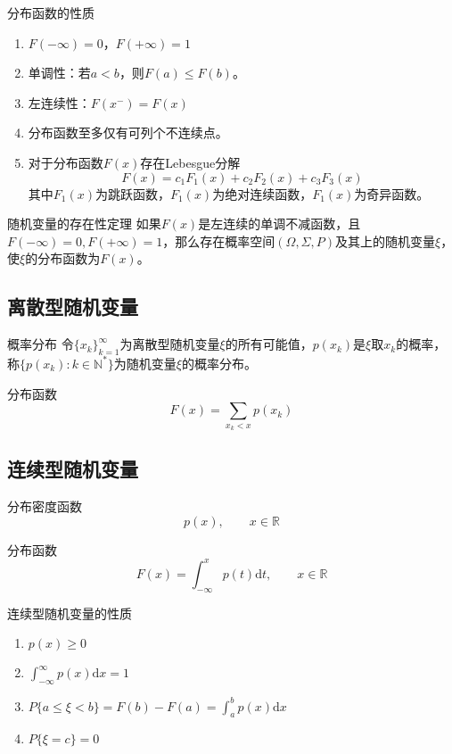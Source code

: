 \documentclass[lang = cn, scheme = chinese, thmcnt = section]{elegantbook}
\newcommand{\N}{\mathbb{N}}            %
\newcommand{\R}{\mathbb{R}}            %
\begin{document}
\begin{proposition}{分布函数的性质}
	\begin{enumerate}
		\item $F(-\infty)=0$，$F(+\infty)=1$
		\item 单调性：若$a<b$，则$F(a)\le F(b)$。
		\item 左连续性：$F(x^-)=F(x)$
		\item 分布函数至多仅有可列个不连续点。
		\item 对于分布函数$F(x)$存在Lebesgue分解
		$$
		F(x)=c_1F_1(x)+c_2F_2(x)+c_3F_3(x)
		$$
		其中$F_1(x)$为跳跃函数，$F_1(x)$为绝对连续函数，$F_1(x)$为奇异函数。
	\end{enumerate}
\end{proposition}

\begin{theorem}{随机变量的存在性定理}
	如果$F(x)$是左连续的单调不减函数，且$F(-\infty)=0,F(+\infty)=1$，那么存在概率空间$(\Omega,\Sigma,P)$及其上的随机变量$\xi$，使$\xi$的分布函数为$F(x)$。
\end{theorem}

\subsection{离散型随机变量}

\begin{definition}{概率分布}
	令$\{x_k\}_{k=1}^{\infty}$为离散型随机变量$\xi$的所有可能值，$p(x_k)$是$\xi$取$x_k$的概率，称$\{p(x_k):k\in\N^*\}$为随机变量$\xi$的概率分布。
\end{definition}

\begin{definition}{分布函数}
	$$
	F(x)=\sum_{x_k<x}{p(x_k)}
	$$
\end{definition}

\subsection{连续型随机变量}

\begin{definition}{分布密度函数}
	$$
	p(x),\qquad x\in\R
	$$
\end{definition}

\begin{definition}{分布函数}
	$$
	F(x)=\int_{-\infty}^{x}p(t)\mathrm{d}t,\qquad x\in\R
	$$
\end{definition}

\begin{proposition}{连续型随机变量的性质}
	\begin{enumerate}
		\item $p(x)\ge 0$
		\item $\int_{-\infty}^{\infty}{p(x)\mathrm{d}x}=1$
		\item $P\{a\le \xi <b\}=F(b)-F(a)=\int_{a}^{b}{p(x)\mathrm{d}x}$
		\item $P\{\xi=c\}=0$
	\end{enumerate}
\end{proposition}
\end{document}
